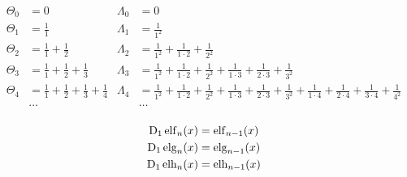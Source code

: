\begin{equation*} \begin{aligned}
\Theta_0 &= 0 &
\Lambda_0 &= 0 \\
%
\Theta_1 &= 
  \frac{1}{1} &
\Lambda_1 &= 
  \frac{1}{1^2} \\
%
\Theta_2 &= 
  \frac{1}{1} 
+ \frac{1}{2} &
\Lambda_2 &= 
  \frac{1}{1^2} 
+ \frac{1}{1 \cdot 2} 
+ \frac{1}{2^2} \\
%
\Theta_3 &= 
  \frac{1}{1} 
+ \frac{1}{2} 
+ \frac{1}{3} &
\Lambda_3 &= 
  \frac{1}{1^2} 
+ \frac{1}{1 \cdot 2} 
+ \frac{1}{2^2}
+ \frac{1}{1 \cdot 3}
+ \frac{1}{2 \cdot 3}
+ \frac{1}{3^2} \\
%
\Theta_4 &= 
  \frac{1}{1} 
+ \frac{1}{2} 
+ \frac{1}{3} 
+ \frac{1}{4} &
\Lambda_4 &= 
  \frac{1}{1^2} 
+ \frac{1}{1 \cdot 2} 
+ \frac{1}{2^2}
+ \frac{1}{1 \cdot 3}
+ \frac{1}{2 \cdot 3}
+ \frac{1}{3^2}
+ \frac{1}{1 \cdot 4}
+ \frac{1}{2 \cdot 4}
+ \frac{1}{3 \cdot 4}
+ \frac{1}{4^2} \\
%
&\ldots & &\ldots \\
\end{aligned} \end{equation*}

\begin{equation*} \begin{aligned}
\mathrm{D}_1 \operatorname{elf}_n(x) &= \operatorname{elf}_{n - 1}(x) \\
\mathrm{D}_1 \operatorname{elg}_n(x) &= \operatorname{elg}_{n - 1}(x) \\
\mathrm{D}_1 \operatorname{elh}_n(x) &= \operatorname{elh}_{n - 1}(x) \\
\end{aligned} \end{equation*}